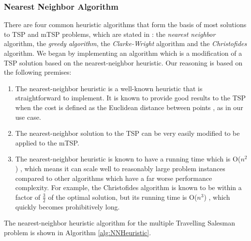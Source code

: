 \subsubsection{Nearest Neighbor Algorithm}
There are four common heuristic algorithms that form the basis of most solutions to TSP and mTSP problems, which are stated in \cite{Johnson1997TheOptimization}: the \textit{nearest neighbor} algorithm, the \textit{greedy algorithm}, the \textit{Clarke-Wright} algorithm and the \textit{Christofides} algorithm. We began by implementing an algorithm which is a modification of a TSP solution based on the nearest-neighbor heuristic. Our reasoning is based on the following premises:
\begin{enumerate}
    \item The nearest-neighbor heuristic is a well-known heuristic that is straightforward to implement. It is known to provide good results to the TSP when the cost is defined as the Euclidean distance between points \cite{Johnson1995TheOptimization}, as in our use case.
    \item The nearest-neighbor solution to the TSP can be very easily modified to be applied to the mTSP.
    \item The nearest-neighbor heuristic is known to have a running time which is O($n^2$) \cite{Rosenkrantz1977AnProblem}, which means it can scale well to reasonably large problem instances compared to other algorithms which have a far worse performance complexity. For example, the Christofides algorithm is known to be within a factor of $\frac{3}{2}$ of the optimal solution, but its running time is O($n^3$) \cite{Christofides1976WORST-CASEPROBLEM}, which quickly becomes prohibitively long.
\end{enumerate}

The nearest-neighbor heuristic algorithm for the multiple Travelling Salesman problem is shown in Algorithm \ref{alg:NNHeuristic}.

